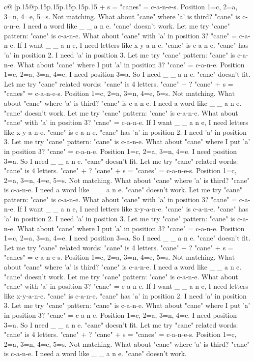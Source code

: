 \documentclass{article}
\begin{document}
{\begin{supertabular}{c@{$\;$}|p{.15\linewidth}@{}p{.15\linewidth}p{.15\linewidth}p{.15\linewidth}p{.15\linewidth}p{.15\linewidth}}
{{{+ s = "canes" = c{-}a{-}n{-}e{-}s. Position 1=c, 2=a, 3=n, 4=e, 5=s. Not matching. What about "cane" where 'a' is third? "cane" is c{-}a{-}n{-}e. I need a word like \_ \_ a n e. "cane" doesn't work. Let me try "cane" pattern: "cane" is c{-}a{-}n{-}e. What about "cane" with 'a' in position 3? "cane" = c{-}a{-}n{-}e. If I want \_ \_ a n e, I need letters like x{-}y{-}a{-}n{-}e. "cane" is c{-}a{-}n{-}e. "cane" has 'a' in position 2. I need 'a' in position 3. Let me try "cane" pattern: "cane" is c{-}a{-}n{-}e. What about "cane" where I put 'a' in position 3? "cane" = c{-}a{-}n{-}e. Position 1=c, 2=a, 3=n, 4=e. I need position 3=a. So I need \_ \_ a n e. "cane" doesn't fit. Let me try "cane" related words: "cane" is 4 letters. "cane" + ? "cane" + s = "canes" = c{-}a{-}n{-}e{-}s. Position 1=c, 2=a, 3=n, 4=e, 5=s. Not matching. What about "cane" where 'a' is third? "cane" is c{-}a{-}n{-}e. I need a word like \_ \_ a n e. "cane" doesn't work. Let me try "cane" pattern: "cane" is c{-}a{-}n{-}e. What about "cane" with 'a' in position 3? "cane" = c{-}a{-}n{-}e. If I want \_ \_ a n e, I need letters like x{-}y{-}a{-}n{-}e. "cane" is c{-}a{-}n{-}e. "cane" has 'a' in position 2. I need 'a' in position 3. Let me try "cane" pattern: "cane" is c{-}a{-}n{-}e. What about "cane" where I put 'a' in position 3? "cane" = c{-}a{-}n{-}e. Position 1=c, 2=a, 3=n, 4=e. I need position 3=a. So I need \_ \_ a n e. "cane" doesn't fit. Let me try "cane" related words: "cane" is 4 letters. "cane" + ? "cane" + s = "canes" = c{-}a{-}n{-}e{-}s. Position 1=c, 2=a, 3=n, 4=e, 5=s. Not matching. What about "cane" where 'a' is third? "cane" is c{-}a{-}n{-}e. I need a word like \_ \_ a n e. "cane" doesn't work. Let me try "cane" pattern: "cane" is c{-}a{-}n{-}e. What about "cane" with 'a' in position 3? "cane" = c{-}a{-}n{-}e. If I want \_ \_ a n e, I need letters like x{-}y{-}a{-}n{-}e. "cane" is c{-}a{-}n{-}e. "cane" has 'a' in position 2. I need 'a' in position 3. Let me try "cane" pattern: "cane" is c{-}a{-}n{-}e. What about "cane" where I put 'a' in position 3? "cane" = c{-}a{-}n{-}e. Position 1=c, 2=a, 3=n, 4=e. I need position 3=a. So I need \_ \_ a n e. "cane" doesn't fit. Let me try "cane" related words: "cane" is 4 letters. "cane" + ? "cane" + s = "canes" = c{-}a{-}n{-}e{-}s. Position 1=c, 2=a, 3=n, 4=e, 5=s. Not matching. What about "cane" where 'a' is third? "cane" is c{-}a{-}n{-}e. I need a word like \_ \_ a n e. "cane" doesn't work. Let me try "cane" pattern: "cane" is c{-}a{-}n{-}e. What about "cane" with 'a' in position 3? "cane" = c{-}a{-}n{-}e. If I want \_ \_ a n e, I need letters like x{-}y{-}a{-}n{-}e. "cane" is c{-}a{-}n{-}e. "cane" has 'a' in position 2. I need 'a' in position 3. Let me try "cane" pattern: "cane" is c{-}a{-}n{-}e. What about "cane" where I put 'a' in position 3? "cane" = c{-}a{-}n{-}e. Position 1=c, 2=a, 3=n, 4=e. I need position 3=a. So I need \_ \_ a n e. "cane" doesn't fit. Let me try "cane" related words: "cane" is 4 letters. "cane" + ? "cane" + s = "canes" = c{-}a{-}n{-}e{-}s. Position 1=c, 2=a, 3=n, 4=e, 5=s. Not matching. What about "cane" where 'a' is third? "cane" is c{-}a{-}n{-}e. I need a word like \_ \_ a n e. "cane" doesn't work. }}}
\end{supertabular}}
\end{document}
